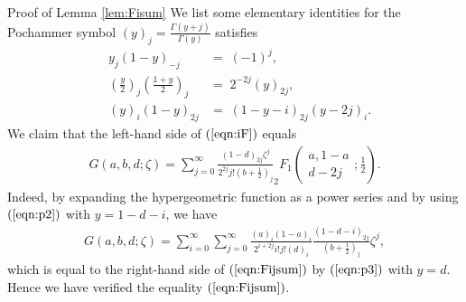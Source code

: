 \documentclass{article}
\numberwithin{equation}{section}
\newenvironment{proof*}[1]{\noindent\textbf{#1\ }}{\hspace*{\fill}$\Box$\medskip}
\begin{document}
\begin{proof*}{Proof of Lemma \ref{lem:Fisum}}
  We list some elementary identities for the Pochammer symbol $(y)_j =
  \frac{\Gamma (y + j)}{\Gamma (y)}$ satisfies
  \begin{eqnarray}
    & y_j (1 - y)_{- j} & = \; (- 1)^j,  \label{eqn:p1}\\
    & \left( \frac{y}{2} \right)_j \left( \frac{1 + y}{2} \right)_j & = \;
    2^{- 2 j} (y)_{2 j},  \label{eqn:p2}\\
    & (y)_i (1 - y)_{2 j} & = \; (1 - y - i)_{2 j} (y - 2 j)_i . 
    \label{eqn:p3}
  \end{eqnarray}
  We claim that the left-hand side of $(\ref{eqn:iF})$ equals
  \begin{eqnarray}
    & G (a, b, d ; \zeta) = \sum_{j = 0}^{\infty} \frac{(1 - d)_{2 j}
    \zeta^j}{2^{2 j} j! \left( b + \frac{1}{2} \right)_j} _2 F_1 \left(
    \begin{array}{c}
      a, 1 - a\\
      d - 2 j
    \end{array} ; \frac{1}{2} \right) . &  \label{eqn:Fijsum}
  \end{eqnarray}
  Indeed, by expanding the hypergeometric function as a power series and by
  using $(\ref{eqn:p2})$ with $y = 1 - d - i$, we have
  \begin{eqnarray}
    & G (a, b, d ; \zeta) = \sum_{i = 0}^{\infty} \sum_{j = 0}^{\infty}
    \frac{(a)_i (1 - a)_i}{2^{i + 2 j} i!j! (d)_i}  \frac{(1 - d - i)_{2
    j}}{\left( b + \frac{1}{2} \right)_j} \zeta^j, &  \nonumber
  \end{eqnarray}
  which is equal to the right-hand side of $(\ref{eqn:Fijsum})$ by
  $(\ref{eqn:p3})$ with $y = d$. Hence we have verified the equality
  $(\ref{eqn:Fijsum})$.
  

\end{proof*}
\end{document}
